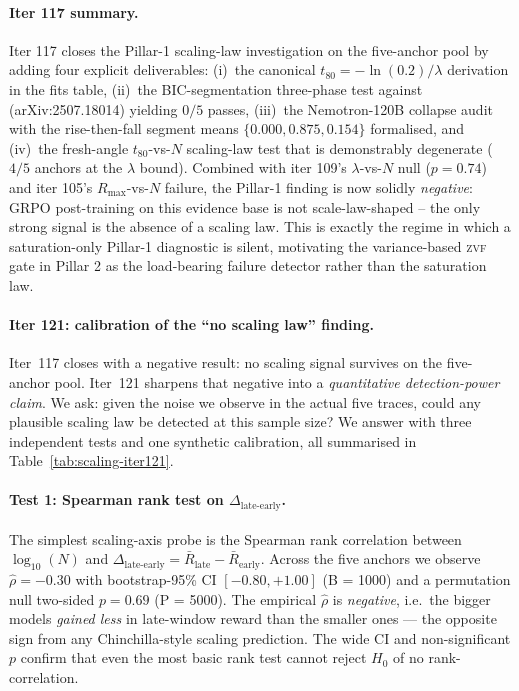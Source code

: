 \documentclass{article}
\providecommand{\tableref}[1]{Table~\ref{#1}}
\begin{document}
\paragraph{Iter 117 summary.}
\label{par:scaling-iter117-summary}
Iter 117 closes the Pillar-1 scaling-law investigation on the
five-anchor pool by adding four explicit deliverables: (i)~the
canonical $t_{80}=-\ln(0.2)/\lambda$ derivation in the fits table,
(ii)~the BIC-segmentation three-phase test against
\citet{nimmaturi2025predictive} (arXiv:2507.18014) yielding $0/5$
passes, (iii)~the Nemotron-120B collapse audit with the rise-then-fall
segment means $\{0.000, 0.875, 0.154\}$ formalised, and (iv)~the
fresh-angle $t_{80}$-vs-$N$ scaling-law test that is demonstrably
degenerate ($4/5$ anchors at the $\lambda$ bound).  Combined with
iter 109's $\lambda$-vs-$N$ null ($p = 0.74$) and iter 105's
$R_{\max}$-vs-$N$ failure, the Pillar-1 finding is now solidly
\emph{negative}: GRPO post-training on this evidence base is not
scale-law-shaped -- the only strong signal is the absence of a
scaling law.  This is exactly the regime in which a
saturation-only Pillar-1 diagnostic is silent, motivating the
variance-based \textsc{zvf} gate in Pillar 2 as the load-bearing
failure detector rather than the saturation law.

\paragraph{Iter 121: calibration of the ``no scaling law'' finding.}
\label{par:scaling-iter121}
Iter~117 closes with a negative result: no scaling signal survives
on the five-anchor pool.  Iter~121 sharpens that negative into a
\emph{quantitative detection-power claim}.  We ask: given the noise
we observe in the actual five traces, could any plausible scaling
law be detected at this sample size?  We answer with three
independent tests and one synthetic calibration, all summarised in
\tableref{tab:scaling-iter121}.

\paragraph{Test 1: Spearman rank test on $\Delta_{\text{late-early}}$.}
\label{par:scaling-iter121-le}
The simplest scaling-axis probe is the Spearman rank correlation
between $\log_{10}(N)$ and $\Delta_{\text{late-early}}
= \bar R_{\text{late}} - \bar R_{\text{early}}$.  Across the five
anchors we observe $\hat\rho = -0.30$ with bootstrap-95\% CI
$[-0.80, +1.00]$ (B = 1000) and a permutation null two-sided
$p = 0.69$ (P = 5000).  The empirical $\hat\rho$ is \emph{negative},
i.e.\ the bigger models \emph{gained less} in late-window reward
than the smaller ones --- the opposite sign from any Chinchilla-style
scaling prediction.  The wide CI and non-significant $p$ confirm
that even the most basic rank test cannot reject $H_0$ of no
rank-correlation.
\end{document}
